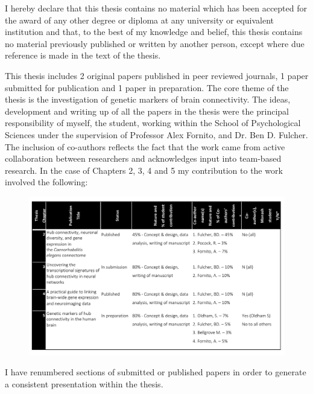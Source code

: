 \vspace*{20mm}
\vspace{10mm}

I hereby declare that this thesis contains no material which has been accepted for the award of any other degree or diploma at any university or equivalent institution and that, to the best of my knowledge and belief, this thesis contains no material previously published or written by another person, except where due reference is made in the text of the thesis. 

This thesis includes 2 original papers published in peer reviewed journals, 1 paper submitted for publication and 1 paper in preparation. The core theme of the thesis is the investigation of genetic markers of brain connectivity. The ideas, development and writing up of all the papers in the thesis were the principal responsibility of myself, the student, working within the School of Psychological Sciences under the supervision of Professor Alex Fornito, and Dr. Ben D. Fulcher. The inclusion of co-authors reflects the fact that the work came from active collaboration between researchers and acknowledges input into team-based research. In the case of Chapters 2, 3, 4 and 5 my contribution to the work involved the following:

\begin{figure}[h!]
    \includegraphics[width=1\textwidth]{declarationTable.pdf}
\label{declaration}
\end{figure}

\newpage
I have renumbered sections of submitted or published papers in order to generate a consistent presentation within the thesis.\\

